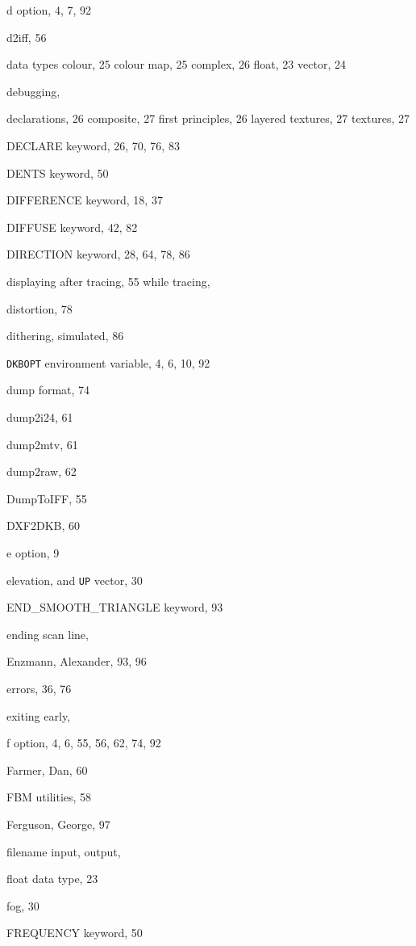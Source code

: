 \begin{theindex}
  \item {\ptt d} option, 4, 7, 92
  \item {\ptt d2iff}, 56
  \item data types
    \subitem colour, 25
    \subitem colour map, 25
    \subitem complex, 26
    \subitem float, 23
    \subitem vector, 24
  \item debugging, 
  \item declarations, 26
    \subitem composite, 27
    \subitem first principles, 26
    \subitem layered textures, 27
    \subitem textures, 27
  \item {\ptt DECLARE} keyword, 26, 70, 76, 83
  \item {\ptt DENTS} keyword, 50
  \item {\ptt DIFFERENCE} keyword, 18, 37
  \item {\ptt DIFFUSE} keyword, 42, 82
  \item {\ptt DIRECTION} keyword, 28, 64, 78, 86
  \item displaying
    \subitem after tracing, 55
    \subitem while tracing, 
  \item distortion, 78
  \item dithering, simulated, 86
  \item {\tt DKBOPT} environment variable, 4, 6, 10, 92
  \item dump format, 74
  \item {\ptt dump2i24}, 61
  \item {\ptt dump2mtv}, 61
  \item {\ptt dump2raw}, 62
  \item {\ptt DumpToIFF}, 55
  \item {\ptt DXF2DKB}, 60

  \indexspace

  \item {\ptt e} option, 9
  \item elevation, and {\tt UP} vector, 30
  \item {\ptt END\_SMOOTH_TRIANGLE} keyword, 93
  \item ending scan line, 
  \item Enzmann, Alexander, 93, 96
  \item errors, 36, 76
  \item exiting early, 

  \indexspace

  \item {\ptt f} option, 4, 6, 55, 56, 62, 74, 92
  \item Farmer, Dan, 60
  \item FBM utilities, 58
  \item Ferguson, George, 97
  \item filename
    \subitem input, 
    \subitem output, 
  \item float data type, 23
  \item fog, 30
  \item {\ptt FREQUENCY} keyword, 50


\end{theindex}

